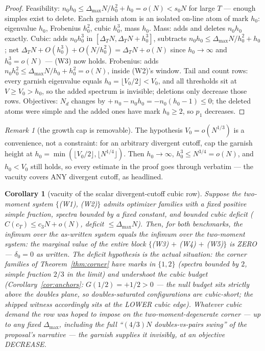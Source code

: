 \documentclass[11pt]{article}
\theoremstyle{plain}
\newtheorem{corollary}[theorem]{Corollary}
\theoremstyle{definition}
\theoremstyle{remark}
\newtheorem*{remk}{Remark}
\newcommand{\Nd}{N_{d}}
\begin{document}
\begin{proof}
Feasibility: $n_0 h_0 \le \Delta_{\max} N/h_0^2 + h_0 = o(N) < s_0 N$ for large
$T$ --- enough simples exist to delete. Each garnish atom is an isolated on-line
atom of mark $h_0$: eigenvalue $h_0$, Frobenius $h_0^2$, cubic $h_0^3$, mass
$h_0$. Mass: adds and deletes $n_0 h_0$ exactly. Cubic: adds $n_0 h_0^3$ in
$[\Delta_T N, \Delta_T N + h_0^3]$, subtracts
$n_0 h_0 \le \Delta_{\max} N/h_0^2 + h_0$; net
$\Delta_T N + O(h_0^3) + O(N/h_0^2) = \Delta_T N + o(N)$ since
$h_0 \to \infty$ and $h_0^3 = o(N)$ --- (W3) now holds. Frobenius: adds
$n_0 h_0^2 \le \Delta_{\max} N/h_0 + h_0^2 = o(N)$, inside (W2)'s window. Tail
and count rows: every garnish eigenvalue equals $h_0 = \lfloor V_0/2 \rfloor <
V_0$, and all thresholds sit at $V \ge V_0 > h_0$, so the added spectrum is
invisible; deletions only decrease those rows. Objectives: $\Nd$ changes by
$+\,n_0 - n_0 h_0 = -n_0(h_0 - 1) \le 0$; the deleted atoms were simple and the
added ones have mark $h_0 \ge 2$, so $p_1$ decreases.
\end{proof}

\begin{remk}[the growth cap is removable]
The hypothesis $V_0 = o(N^{1/3})$ is a convenience, not a constraint: for an
arbitrary divergent cutoff, cap the garnish height at
$h_0 = \min(\lfloor V_0/2 \rfloor, \lfloor N^{1/4} \rfloor)$. Then
$h_0 \to \infty$, $h_0^3 \le N^{3/4} = o(N)$, and $h_0 < V_0$ still holds, so
every estimate in the proof goes through verbatim --- the vacuity covers ANY
divergent cutoff, as headlined.
\end{remk}

\begin{corollary}[vacuity of the scalar divergent-cutoff cubic row]
\label{cor:vacuity}
Suppose the two-moment system $\{$(W1), (W2)$\}$ admits optimizer families with a
fixed positive simple fraction, spectra bounded by a fixed constant, and bounded
cubic deficit ($C(c_T) \le c_3 N + o(N)$, deficit $\le \Delta_{\max} N$). Then,
for both benchmarks, the infimum over the as-written system equals the infimum
over the two-moment system: the marginal value of the entire block
$\{$(W3) $+$ (W4) $+$ (W5)$\}$ is ZERO --- $\delta_0 = 0$ as written. The deficit
hypothesis is the actual situation: the corner families of
Theorem~\ref{thm:corner} have marks in $\{1, 2\}$ (spectra bounded by $2$, simple
fraction $2/3$ in the limit) and undershoot the cubic budget
(Corollary~\ref{cor:anchors}: $G(1/2) = +1/2 > 0$ --- the null budget sits
strictly above the doubles plane, so doubles-saturated configurations are
cubic-short; the shipped witness accordingly sits at the LOWER cubic edge).
Whatever cubic demand the row was hoped to impose on the two-moment-degenerate
corner --- up to any fixed $\Delta_{\max}$, including the full ``$(4/3)N$
doubles-vs-pairs swing'' of the proposal's narrative --- the garnish supplies it
invisibly, at an objective DECREASE.
\end{corollary}
\end{document}
